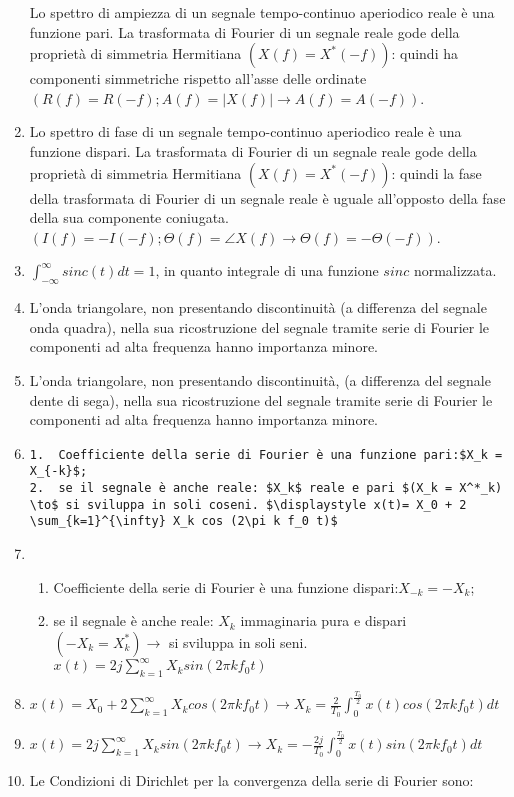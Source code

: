 \documentclass[
  paper=a4,
  ,captions=tableheading
]{scrartcl}
\providecommand{\tightlist}{%
  \setlength{\itemsep}{0pt}\setlength{\parskip}{0pt}}
\begin{document}
\begin{enumerate}
  Lo spettro di ampiezza di un segnale tempo-continuo aperiodico reale è
  una funzione pari. La trasformata di Fourier di un segnale reale gode
  della proprietà di simmetria Hermitiana \((X(f) = X^*(-f))\): quindi
  ha componenti simmetriche rispetto all'asse delle ordinate
  \((R(f)=R(-f); A(f)=|X(f)| \to A(f)=A(-f))\).
\item
  Lo spettro di fase di un segnale tempo-continuo aperiodico reale è una
  funzione dispari. La trasformata di Fourier di un segnale reale gode
  della proprietà di simmetria Hermitiana \((X(f) = X^*(-f))\): quindi
  la fase della trasformata di Fourier di un segnale reale è uguale
  all'opposto della fase della sua componente coniugata.
  \((I(f)=-I(-f); \Theta(f)=\angle X(f) \to \Theta(f)=-\Theta(-f))\).
\item
  \(\displaystyle \int_{-\infty}^\infty sinc(t)dt = 1\), in quanto
  integrale di una funzione \(sinc\) normalizzata.
\item
  L'onda triangolare, non presentando discontinuità (a differenza del
  segnale onda quadra), nella sua ricostruzione del segnale tramite
  serie di Fourier le componenti ad alta frequenza hanno importanza
  minore.
\item
  L'onda triangolare, non presentando discontinuità, (a differenza del
  segnale dente di sega), nella sua ricostruzione del segnale tramite
  serie di Fourier le componenti ad alta frequenza hanno importanza
  minore.
\item
\begin{verbatim}
1.  Coefficiente della serie di Fourier è una funzione pari:$X_k = X_{-k}$;
2.  se il segnale è anche reale: $X_k$ reale e pari $(X_k = X^*_k) \to$ si sviluppa in soli coseni. $\displaystyle x(t)= X_0 + 2 \sum_{k=1}^{\infty} X_k cos (2\pi k f_0 t)$
\end{verbatim}
\item
  \begin{enumerate}
  \def\labelenumii{\arabic{enumii}.}
  \tightlist
  \item
    Coefficiente della serie di Fourier è una funzione
    dispari:\(X_{-k} = -X_{k}\);
  \item
    se il segnale è anche reale: \(X_k\) immaginaria pura e dispari
    \((-X_k = X^*_k) \to\) si sviluppa in soli seni.
    \(\displaystyle x(t)= 2j \sum_{k=1}^{\infty} X_k sin (2\pi k f_0 t)\)
  \end{enumerate}
\item
  \(\displaystyle x(t)=X_0 + 2\sum_{k=1}^{\infty} X_k cos (2\pi k f_0 t) \to X_k = \frac{2}{T_0} \int_{0}^{\frac{T_0}{2}} x(t) cos (2\pi k f_0 t) dt\)
\item
  \(\displaystyle x(t)= 2j \sum_{k=1}^{\infty} X_k sin (2\pi k f_0 t) \to X_k = -\frac{2j}{T_0} \int_{0}^{\frac{T_0}{2}} x(t) sin (2\pi k f_0 t)dt\)
\item
  Le Condizioni di Dirichlet per la convergenza della serie di Fourier
  sono:


\end{enumerate}
\end{document}
